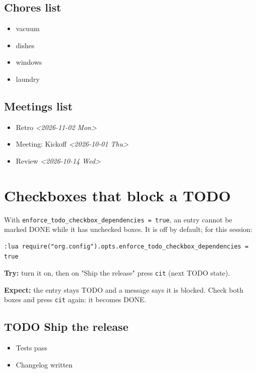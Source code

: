 \subsection{Chores list}
\label{sec:org99af24e}
\begin{itemize}
\item[{$\square$}] vacuum
\item[{$\boxtimes$}] dishes
\item[{$\square$}] windows
\item[{$\boxtimes$}] laundry
\end{itemize}
\subsection{Meetings list}
\label{sec:org9b58fed}
\begin{itemize}
\item Retro \textit{<2026-11-02 Mon>}
\item Meeting: Kickoff \textit{<2026-10-01 Thu>}
\item Review \textit{<2026-10-14 Wed>}
\end{itemize}
\section{Checkboxes that block a TODO}
\label{sec:orgd39765f}
With \texttt{enforce\_todo\_checkbox\_dependencies = true}, an entry cannot be marked
DONE while it has unchecked boxes. It is off by default; for this session:

\begin{verbatim}
:lua require("org.config").opts.enforce_todo_checkbox_dependencies = true
\end{verbatim}

\textbf{Try:} turn it on, then on "Ship the release" press \texttt{cit} (next TODO
state).

\textbf{Expect:} the entry stays TODO and a message says it is blocked. Check both
boxes and press \texttt{cit} again: it becomes DONE.
\subsection{{\bfseries\sffamily TODO} Ship the release}
\label{sec:orgfe04580}
\begin{itemize}
\item[{$\square$}] Tests pass
\item[{$\square$}] Changelog written
\end{itemize}
